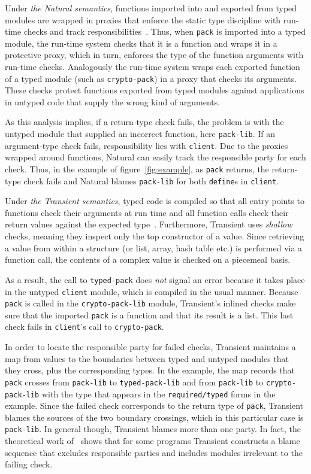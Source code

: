 Under {\it the Natural semantics\/}, functions imported into and exported from
typed modules are wrapped in proxies that enforce the static type discipline
with run-time checks and track responsibilities~\citep{tf-popl-2008,
tfffgksst-snapl-2017}. Thus, when {\tt pack} is imported into a typed module,
the run-time system checks that it is a function and wraps it in a protective
proxy, which in turn, enforces the type of the function arguments with run-time checks.
Analogously the run-time system wraps each exported function of a typed module
(such as {\tt crypto-pack}) in a proxy that checks its arguments.  These checks
protect functions exported from typed modules against applications in untyped
code that supply the wrong kind of arguments.

As this analysis implies, if a return-type check fails, the problem is with
the untyped module that supplied an incorrect function, here {\tt pack-lib}. If
an argument-type check fails, responsibility lies with {\tt client}. Due to the
proxies wrapped around functions, Natural can easily track the responsible party
for each check. Thus, in the example of figure~\ref{fig:example}, as
\texttt{pack} returns, the return-type check fails and Natural blames
\texttt{pack-lib} for both {\tt define}s in {\tt client}.

Under {\it the Transient semantics\/}, typed code is compiled so that all entry
points to functions check their arguments at run time and all function calls
check their return values against the expected type~\citep{vss-popl-2017}.
Furthermore, Transient uses \emph{shallow} checks, meaning they inspect only the
top constructor of a value. Since retrieving a value from within a structure (or
list, array, hash table etc.) is performed via a function call, the contents of a
complex value is checked on a piecemeal basis.

As a result, the call to \texttt{typed-pack} does {\em not\/} signal an error
because it takes place in the untyped {\tt client} module, which is compiled in
the usual manner. Because {\tt pack} is called in the {\tt crypto-pack-lib}
module, Transient's inlined checks make sure that the imported
\texttt{pack} is a function and that its result is a list. This
last check fails in \texttt{client}'s call to {\tt crypto-pack}.

In order to locate the responsible party for failed checks, Transient
maintains a map from values to the boundaries between typed and untyped modules that
they cross, plus the corresponding types. In the example, the map records that
\texttt{pack} crosses from \texttt{pack-lib} to {\tt typed-pack-lib} and
from {\tt pack-lib} to {\tt crypto-pack-lib} with the type that appears in the
{\tt required/typed} forms in the example. Since the failed check corresponds to
the return type of \texttt{pack}, Transient blames the sources of the two
boundary crossings, which in this particular case is \texttt{pack-lib}. In
general though, Transient blames more than one party. In fact, the theoretical
work of~\citet{gfd-oopsla-2019} shows that for some programs Transient
constructs a blame sequence that excludes responsible parties and includes modules
irrelevant to the failing check.

